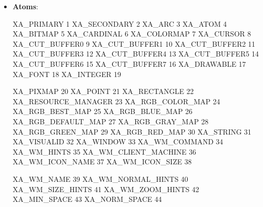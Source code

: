 \documentclass{report}
\begin{document}
    \pagebreak 
    \begin{itemize} 
        \item \textbf{Atoms}:  
            \bigbreak \noindent 
            \begin{cppcode}
                XA_PRIMARY                 1
                XA_SECONDARY               2
                XA_ARC                     3
                XA_ATOM                    4
                XA_BITMAP                  5
                XA_CARDINAL                6
                XA_COLORMAP                7
                XA_CURSOR                  8
                XA_CUT_BUFFER0             9
                XA_CUT_BUFFER1             10
                XA_CUT_BUFFER2             11
                XA_CUT_BUFFER3             12
                XA_CUT_BUFFER4             13
                XA_CUT_BUFFER5             14
                XA_CUT_BUFFER6             15
                XA_CUT_BUFFER7             16
                XA_DRAWABLE                17
                XA_FONT                    18
                XA_INTEGER                 19
            \end{cppcode}
            \bigbreak \noindent 
            \begin{cppcode}
                XA_PIXMAP                  20
                XA_POINT                   21
                XA_RECTANGLE               22
                XA_RESOURCE_MANAGER        23
                XA_RGB_COLOR_MAP           24
                XA_RGB_BEST_MAP            25
                XA_RGB_BLUE_MAP            26
                XA_RGB_DEFAULT_MAP         27
                XA_RGB_GRAY_MAP            28
                XA_RGB_GREEN_MAP           29
                XA_RGB_RED_MAP             30
                XA_STRING                  31
                XA_VISUALID                32
                XA_WINDOW                  33
                XA_WM_COMMAND              34
                XA_WM_HINTS                35
                XA_WM_CLIENT_MACHINE       36
                XA_WM_ICON_NAME            37
                XA_WM_ICON_SIZE            38
            \end{cppcode}
            \bigbreak \noindent 
            \begin{cppcode}
                XA_WM_NAME                 39
                XA_WM_NORMAL_HINTS         40
                XA_WM_SIZE_HINTS           41
                XA_WM_ZOOM_HINTS           42
                XA_MIN_SPACE               43
                XA_NORM_SPACE              44

\end{cppcode}
\end{itemize}
\end{document}
